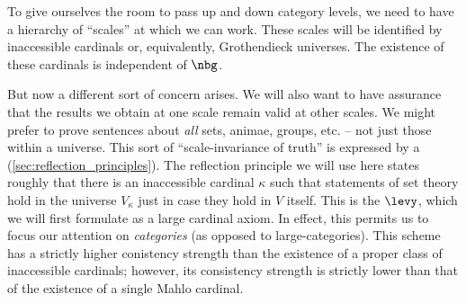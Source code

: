 To give ourselves the room to pass up and down category levels,
we need to have a hierarchy of \enquote{scales} at which we can work.
These scales will be identified by inaccessible cardinals
or, equivalently, Grothendieck universes.
The existence of these cardinals is independent of $ \nbg $.

But now a different sort of concern arises.
We will also want to have assurance
that the results we obtain at one scale remain valid at other scales.
We might prefer to prove sentences about
\emph{all} sets, animae, groups, etc. --
not just those within a universe.
This sort of \enquote{scale-invariance of truth}
is expressed by a  (\ref{sec:reflection_principles}).
The reflection principle we will use here states roughly that
there is an inaccessible cardinal $ \kappa $ such that
statements of set theory hold in the universe $ V_{\kappa} $
just in case they hold in $V$ itself.
This is the  $ \levy $,
which we will first formulate as a large cardinal axiom.
In effect, this permits us to focus our attention on \emph{categories}
(as opposed to large-categories).
This scheme has a strictly higher conistency strength
than the existence of a proper class of inaccessible cardinals;
however, its consistency strength is strictly lower
than that of the existence of a single Mahlo cardinal.














